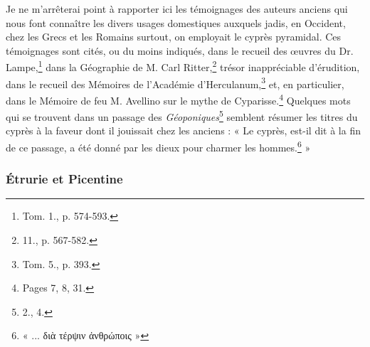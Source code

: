 \documentclass{article}
\begin{document}
Je ne m'arrêterai point à rapporter ici les témoignages des auteurs anciens qui nous font connaître les divers usages domestiques auxquels jadis, en Occident, chez les Grecs et les Romains surtout, on employait le cyprès pyramidal. Ces témoignages sont cités, ou du moins indiqués, dans le recueil des œuvres du Dr. Lampe,\footnote{Tom. 1., p. 574-593.} dans la Géographie de M. Carl Ritter,\footnote{11., p. 567-582.} trésor inappréciable d'érudition, dans le recueil des Mémoires de l'Académie d'Herculanum,\footnote{Tom. 5., p. 393.} et, en particulier, dans le Mémoire de feu M. Avellino sur le mythe de Cyparisse.\footnote{Pages 7, 8, 31.} Quelques mots qui se trouvent dans un passage des \emph{Géoponiques}\footnote{2., 4.} semblent résumer les titres du cyprès à la faveur dont il jouissait chez les anciens : « Le cyprès, est-il dit à la fin de ce passage, a été donné par les dieux pour charmer les hommes.\footnote{« ... \textgreek{διὰ τέρψιν ἀνθρώποις} »} »

\subsubsection{Étrurie et Picentine}
\end{document}
